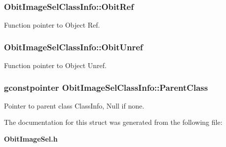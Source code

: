 \subsubsection{ {\bf Obit\-Image\-Sel\-Class\-Info::Obit\-Ref}}\label{structObitImageSelClassInfo_o10}


Function pointer to Object Ref. 

\subsubsection{ {\bf Obit\-Image\-Sel\-Class\-Info::Obit\-Unref}}\label{structObitImageSelClassInfo_o11}


Function pointer to Object Unref. 

\subsubsection{\setlength{\rightskip}{0pt plus 5cm}gconstpointer {\bf Obit\-Image\-Sel\-Class\-Info::Parent\-Class}}\label{structObitImageSelClassInfo_o3}


Pointer to parent class Class\-Info, Null if none. 



The documentation for this struct was generated from the following file:\begin{CompactItemize}
\item 
{\bf Obit\-Image\-Sel.h}\end{CompactItemize}
